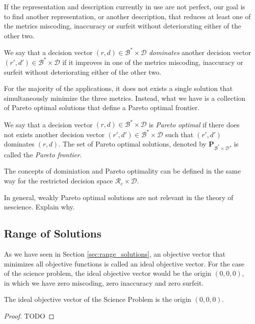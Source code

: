 If the representation and description currently in use are not perfect, our goal is to find another representation, or another description, that reduces at least one of the metrics miscoding, inaccuracy or surfeit without deteriorating either of the other two.

\begin{definition}
We say that a decision vector $(r, d) \in \mathcal{B}^\ast \times \mathcal{D}$ \emph{dominates} another decision vector $(r', d') \in \mathcal{B}^\ast \times \mathcal{D}$ if it improves in one of the metrics miscoding, inaccuracy or surfeit without deteriorating either of the other two.
\end{definition}

For the majority of the applications, it does not exists a single solution that simultaneously minimize the three metrics. Instead, what we have is a collection of Pareto optimal solutions that define a Pareto optimal frontier.

\begin{definition}
We say that a decision vector $(r, d) \in \mathcal{B}^\ast \times \mathcal{D}$ is \emph{Pareto optimal} if there does not exists another decision vector $(r', d') \in \mathcal{B}^\ast \times \mathcal{D}$ such that $(r', d')$ dominates $(r, d)$. The set of Pareto optimal solutions, denoted by $\mathbf{P}_{\mathcal{B}^\ast \times \mathcal{D}}$, is called the \emph{Pareto frontier}.
\end{definition}

The concepts of dominiation and Pareto optimality can be defined in the same way for the restricted decision space $\mathcal{R}_e \times \mathcal{D}$.

{\color{red} In general, weakly Pareto optimal solutions are not relevant in the theory of nescience. Explain why.}


\subsection{Range of Solutions}

As we have seen in Section \ref{sec:range_solutions}, an objective vector that minimizes all objective functions is called an ideal objective vector. For the case of the science problem, the ideal objective vector would be the origin $(0, 0, 0)$, in which we have zero miscoding, zero inaccuracy and zero surfeit.

\begin{proposition}
The ideal objective vector of the Science Problem is the origin $(0, 0, 0)$.
\end{proposition}
\begin{proof}
{\color{red} TODO}
\end{proof}

